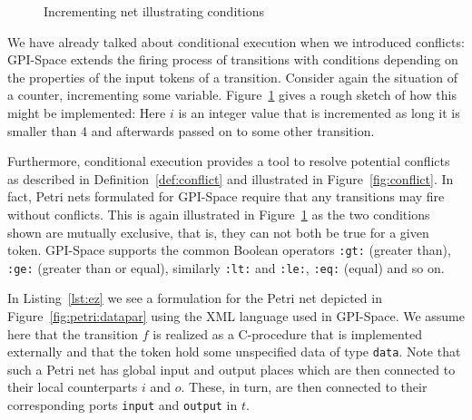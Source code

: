 \documentclass[
  paper=a4,
  titlepage,
  bibliography=totoc,
  pagesize=pdftex
]{scrartcl}
\numberwithin{figure}{section}
\numberwithin{equation}{section}
\numberwithin{table}{section}
\theoremstyle{definition}
\numberwithin{definition}{section}
\begin{document}
\begin{figure}[htbp]
  \centering
  \caption{Incrementing net illustrating conditions}
  \label{fig:inc}
\end{figure}

We have already talked about conditional execution when we introduced conflicts: GPI-Space
extends the firing process of transitions with conditions depending on the properties of
the input tokens of a transition. Consider again the situation of a counter, incrementing
some variable. Figure~\ref{fig:inc} gives a rough sketch of how this might be implemented:
Here $i$ is an integer value that is incremented as long it is smaller than 4 and
afterwards passed on to some other transition.

Furthermore, conditional execution provides a tool to resolve potential conflicts as
described in Definition~\ref{def:conflict} and illustrated in Figure~\ref{fig:conflict}.
In fact, Petri nets formulated for GPI-Space require that any transitions may fire without
conflicts. This is again illustrated in Figure~\ref{fig:inc} as the two conditions shown
are mutually exclusive, that is, they can not both be true for a given token. GPI-Space
supports the common Boolean operators \texttt{:gt:} (greater than), \texttt{:ge:} (greater
than or equal), similarly \texttt{:lt:} and \texttt{:le:}, \texttt{:eq:} (equal) and so
on.

In Listing~\ref{lst:ez} we see a formulation for the Petri net depicted in
Figure~\ref{fig:petri:datapar} using the XML language used in GPI-Space. We assume here
that the transition $f$ is realized as a C-procedure that is implemented externally and
that the token hold some unspecified data of type \texttt{data}. Note that such a Petri
net has global input and output places which are then connected to their local
counterparts $i$ and $o$. These, in turn, are then connected to their corresponding ports
\texttt{input} and \texttt{output} in $t$.
\end{document}
